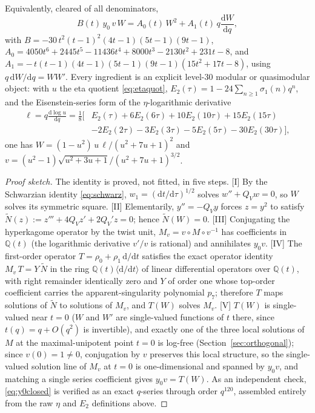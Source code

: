 \documentclass[11pt]{article}
\newcommand{\rmd}{\mathrm{d}}
\theoremstyle{plain}
\theoremstyle{remark}
\begin{document}
Equivalently, cleared of all denominators,
\begin{equation}
B(t)\,y_0\,v\,W=A_0(t)\,W^2+A_1(t)\,q\frac{\rmd W}{\rmd q},
\label{eq:y0poly}
\end{equation}
with $B=-30\,t^2(t-1)^2(4t-1)(5t-1)(9t-1)$,
$A_0=4050t^6+2445t^5-11436t^4+8000t^3-2130t^2+231t-8$, and
$A_1=-\,t(t-1)(4t-1)(5t-1)(9t-1)(15t^2+17t-8)$, using $q\,\rmd W/\rmd q=WW'$. Every ingredient
is an explicit level-30 modular or quasimodular object: with $u$ the eta quotient \eqref{eq:etaquot},
$E_2(\tau)=1-24\sum_{n\ge1}\sigma_1(n)q^n$, and the Eisenstein-series form of the $\eta$-logarithmic
derivative
\begin{equation}
\begin{split}
\ell=q\frac{\rmd\log u}{\rmd q}=\tfrac18\big[&E_2(\tau)+6E_2(6\tau)+10E_2(10\tau)+15E_2(15\tau)\\
&-2E_2(2\tau)-3E_2(3\tau)-5E_2(5\tau)-30E_2(30\tau)\big],
\end{split}
\label{eq:ell}
\end{equation}
one has $W=(1-u^2)\,u\,\ell/(u^2+7u+1)^2$ and $v=(u^2-1)\sqrt{u^2+3u+1}/(u^2+7u+1)^{3/2}$.

\begin{proof}[Proof sketch]
The identity is proved, not fitted, in five steps.
[I] By the Schwarzian identity \eqref{eq:schwarz}, $w_1=(\rmd t/\rmd\tau)^{1/2}$ solves
$w''+Q_Vw=0$, so $W$ solves its symmetric square.
[II] Elementarily, $y''=-Q_Vy$ forces $z=y^2$ to satisfy
$\widetilde N(z):=z'''+4Q_Vz'+2Q_V'z=0$; hence $\widetilde N(W)=0$.
[III] Conjugating the hyperkagome operator by the twist unit, $M_v=v\circ M\circ v^{-1}$ has
coefficients in $\mathbb{Q}(t)$ (the logarithmic derivative $v'/v$ is rational) and annihilates
$y_0v$.
[IV] The first-order operator $T=\rho_0+\rho_1\,\rmd/\rmd t$ satisfies the exact operator identity
$M_v\,T=Y\,\widetilde N$ in the ring $\mathbb{Q}(t)\langle\rmd/\rmd t\rangle$ of linear differential
operators over $\mathbb{Q}(t)$, with right remainder
identically zero and $Y$ of order one whose top-order coefficient carries the
apparent-singularity polynomial $p_7$; therefore $T$ maps solutions of $\widetilde N$ to
solutions of $M_v$, and $T(W)$ solves $M_v$.
[V] $T(W)$ is single-valued near $t=0$ ($W$ and $W'$ are single-valued functions of $t$ there,
since $t(q)=q+O(q^2)$ is invertible), and exactly one of the three local solutions of $M$ at the
maximal-unipotent point $t=0$ is log-free (Section~\ref{sec:orthogonal}); since $v(0)=1\neq0$,
conjugation by $v$ preserves this local structure, so the single-valued solution line of $M_v$
at $t=0$ is one-dimensional and spanned by $y_0v$, and matching a single
series coefficient gives $y_0v=T(W)$. As an independent check, \eqref{eq:y0closed} is verified as
an exact $q$-series through order $q^{120}$, assembled entirely from the raw $\eta$ and $E_2$
definitions above.
\end{proof}
\end{document}
